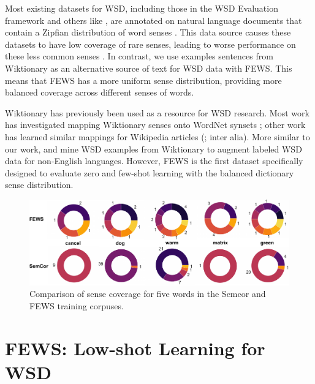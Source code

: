 \documentclass[11pt,a4paper]{article}
\begin{document}
Most existing datasets for WSD, including those in the WSD Evaluation framework and others like \citet{pradhan2007ontonotes}, are annotated on natural language documents that contain a Zipfian distribution of word senses \cite{kilgarriff2004dominant}. This data source causes these datasets to have low coverage of rare senses, leading to worse performance on these less common senses \cite{postma2016more, kumar2019zero}. In contrast, we use examples sentences from Wiktionary as an alternative source of text for WSD data with FEWS. This means that FEWS has a more uniform sense distribution, providing more balanced coverage across different senses of words.

Wiktionary has previously been used as a resource for WSD research. Most work has investigated mapping Wiktionary senses onto WordNet synsets \cite{meyer2011psycholinguists, matuschek2013tacl}; other work has learned similar mappings for Wikipedia articles (\citet{mihalcea2007using, navigli2012babelnet}; inter alia). More similar to our work, \citet{henrich2012webcage} and \citet{segonne2019using} mine WSD examples from Wiktionary to augment labeled WSD data for non-English languages. However, FEWS is the first dataset specifically designed to evaluate zero and few-shot learning with the balanced dictionary sense distribution.

\begin{figure}[t]
\centering
\includegraphics[width=\linewidth]{figures/fixed_sense_coverage_comp.pdf}
\caption{Comparison of sense coverage for five words in the Semcor and FEWS training corpuses.}
\label{sense-coverage-fig}
\end{figure}

\section{FEWS: Low-shot Learning for WSD}
\end{document}
